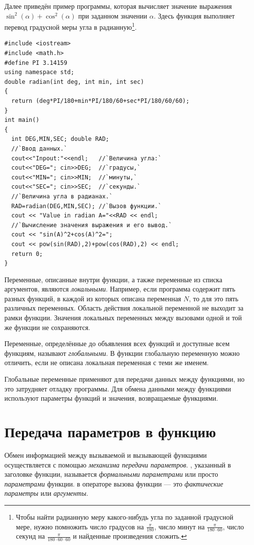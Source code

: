 Далее приведён пример программы, которая вычисляет значение выражения  
$\sin^2(\alpha)+\cos^2(\alpha)$ при заданном значении  $\alpha$. Здесь функция  выполняет
перевод градусной меры угла в радианную\footnote{Чтобы найти радианную меру какого-нибудь угла по заданной градусной
мере, нужно помножить число градусов на  $\frac{\pi}{180}$, число минут на  $\frac{\pi}{180\cdot 60}$, число секунд
на $\frac{\pi}{180\cdot 60\cdot 60}$ и найденные произведения сложить.}.
\begin{lstlisting}
#include <iostream>
#include <math.h>
#define PI 3.14159
using namespace std;
double radian(int deg, int min, int sec)
{
  return (deg*PI/180+min*PI/180/60+sec*PI/180/60/60);
}
int main()
{
  int DEG,MIN,SEC; double RAD;
  //`Ввод данных.`
  cout<<"Inpout:"<<endl;   //`Величина угла:`
  cout<<"DEG="; cin>>DEG;  //`градусы,`
  cout<<"MIN="; cin>>MIN;  //`минуты,`
  cout<<"SEC="; cin>>SEC;  //`секунды.`
  //`Величина угла в радианах.`
  RAD=radian(DEG,MIN,SEC); //`Вызов функции.`
  cout << "Value in radian A="<<RAD << endl;
  //`Вычисление значения выражения и его вывод.`
  cout << "sin(A)^2+cos(A)^2=";
  cout << pow(sin(RAD),2)+pow(cos(RAD),2) << endl;
  return 0;
}
\end{lstlisting}


Переменные, описанные внутри функции, а также переменные из списка аргументов, являются
\emph{локальными}. Например, если программа содержит пять разных функций, в
каждой из которых описана переменная $N$, то для  это пять различных переменных. Область действия локальной переменной
не выходит за рамки функции. Значения локальных переменных между вызовами одной и той же функции не сохраняются. 

Переменные, определённые до объявления всех функций и доступные всем функциям, называют
\emph{глобальными}. В функции глобальную переменную можно отличить, если не
описана локальная переменная с теми же именем.

Глобальные переменные применяют для передачи данных между функциями, но это затрудняет отладку программы. Для обмена
данными между функциями используют параметры функций и значения, возвращаемые функциями.

\section[Передача параметров в функцию]{Передача параметров в функцию}
Обмен информацией между вызываемой и вызывающей функциями осуществляется с помощью \emph{механизма передачи параметров}. , указанный в
заголовке функции, называется \emph{формальными параметрами} или просто
\emph{параметрами} функции.  в операторе вызова функции --- это
\emph{фактические параметры} или \emph{аргументы}. 

